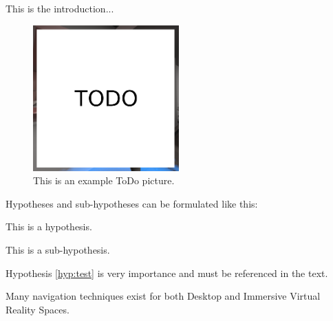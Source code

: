 This is the introduction...

\vspace{0.5cm}

\begin{figure}[]
  \centering
  \includegraphics[width=0.5\textwidth]{images/todo.png}
  \caption{This is an example ToDo picture.}
  \label{fig:todo}
\end{figure}

Hypotheses and sub-hypotheses can be formulated like this:

\begin{hypothesis}
\label{hyp:test}
This is a hypothesis.
\end{hypothesis}

\begin{shypothesis}
\label{shyp:test}
This is a sub-hypothesis.
\end{shypothesis}

Hypothesis \cref{hyp:test} is very importance and must be referenced in the text.

Many navigation techniques exist for both Desktop and Immersive Virtual Reality Spaces. 